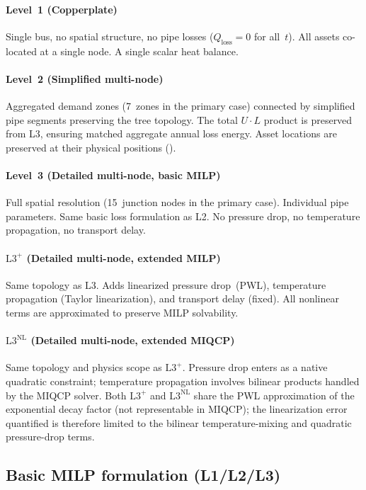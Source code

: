 \documentclass[review,3p]{elsarticle}
\newcommand{\Lplus}{\mathrm{L3}^{+}}
\newcommand{\Lnl}{\mathrm{L3}^{\mathrm{NL}}}
\begin{document}
\paragraph{Level~1 (Copperplate)}
Single bus, no spatial structure, no pipe losses
($Q_{\mathrm{loss}}=0$ for all~$t$). All assets co-located at a
single node. A single scalar heat balance.

\paragraph{Level~2 (Simplified multi-node)}
Aggregated demand zones (7~zones in the primary case) connected by
simplified pipe segments preserving the tree topology. The total
$U \cdot L$ product is preserved from L3, ensuring matched aggregate
annual loss energy. Asset locations are preserved at their physical
positions ().

\paragraph{Level~3 (Detailed multi-node, basic MILP)}
Full spatial resolution (15~junction nodes in the primary case).
Individual pipe parameters. Same basic loss formulation as L2. No
pressure drop, no temperature propagation, no transport delay.

\paragraph{$\Lplus$ (Detailed multi-node, extended MILP)}
Same topology as L3. Adds linearized pressure drop~(PWL),
temperature propagation (Taylor linearization), and transport delay
(fixed). All nonlinear terms are approximated to preserve MILP
solvability.

\paragraph{$\Lnl$ (Detailed multi-node, extended MIQCP)}
Same topology and physics scope as $\Lplus$. Pressure drop enters as
a native quadratic constraint; temperature propagation involves
bilinear products handled by the MIQCP solver. Both $\Lplus$ and
$\Lnl$ share the PWL approximation of the exponential decay factor
(not representable in MIQCP); the linearization error quantified is
therefore limited to the bilinear temperature-mixing and quadratic
pressure-drop terms.

\subsection{Basic MILP formulation (L1/L2/L3)}
\label{sec:milp}
\end{document}
